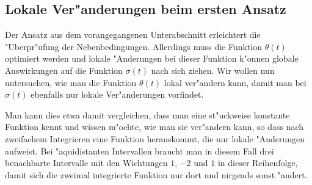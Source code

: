 \documentclass[a4paper]{scrartcl}
\begin{document}
\subsection{Lokale Ver"anderungen beim ersten Ansatz}

Der Ansatz aus dem vorangegangenen Unterabschnitt erleichtert die "Uberpr"ufung der Nebenbedingungen. Allerdings muss die Funktion $\theta(t)$ optimiert werden und lokale "Anderungen bei dieser Funktion k"onnen globale Auswirkungen auf die Funktion $\sigma(t)$ nach sich ziehen. Wir wollen nun untersuchen, wie man die Funktion $\theta(t)$ lokal ver"andern kann, damit man bei $\sigma(t)$ ebenfalls nur lokale Ver"anderungen vorfindet. 

Man kann dies etwa damit vergleichen, dass man eine st"uckweise konstante Funktion kennt und wissen m"ochte, wie man sie ver"andern kann, so dass nach zweifachem Integrieren eine Funktion herauskommt, die nur lokale "Anderungen aufweist. Bei "aquidistanten Intervallen braucht man in diesem Fall drei benachbarte Intervalle mit den Wichtungen $1$, $-2$ und $1$ in dieser Reihenfolge, damit sich die zweimal integrierte Funktion nur dort und nirgends sonst "andert. 
\end{document}
